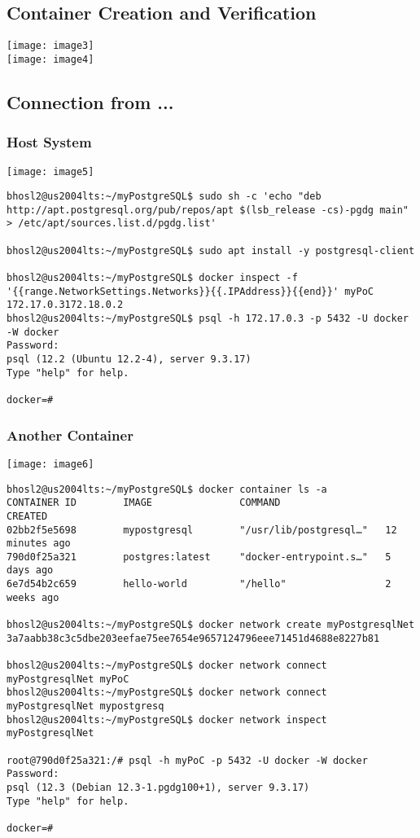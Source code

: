 \documentclass[]{article}
\begin{document}
\subsection{Container Creation and Verification}
	\texttt{[image: image3]} \vspace{1em} \\
	\texttt{[image: image4]}
	\pagebreak
\subsection{Connection from ...}
\subsubsection{Host System}
	\texttt{[image: image5]}
	\begin{verbatim}
bhosl2@us2004lts:~/myPostgreSQL$ sudo sh -c 'echo "deb http://apt.postgresql.org/pub/repos/apt $(lsb_release -cs)-pgdg main" > /etc/apt/sources.list.d/pgdg.list'	

bhosl2@us2004lts:~/myPostgreSQL$ sudo apt install -y postgresql-client

bhosl2@us2004lts:~/myPostgreSQL$ docker inspect -f '{{range.NetworkSettings.Networks}}{{.IPAddress}}{{end}}' myPoC 172.17.0.3172.18.0.2
bhosl2@us2004lts:~/myPostgreSQL$ psql -h 172.17.0.3 -p 5432 -U docker -W docker
Password:
psql (12.2 (Ubuntu 12.2-4), server 9.3.17)
Type "help" for help.

docker=# 
	\end{verbatim}
	\pagebreak
\subsubsection{Another Container}	
	\texttt{[image: image6]}
	\begin{verbatim}
bhosl2@us2004lts:~/myPostgreSQL$ docker container ls -a
CONTAINER ID        IMAGE               COMMAND                  CREATED
02bb2f5e5698        mypostgresql        "/usr/lib/postgresql…"   12 minutes ago
790d0f25a321        postgres:latest     "docker-entrypoint.s…"   5 days ago
6e7d54b2c659        hello-world         "/hello"                 2 weeks ago

bhosl2@us2004lts:~/myPostgreSQL$ docker network create myPostgresqlNet
3a7aabb38c3c5dbe203eefae75ee7654e9657124796eee71451d4688e8227b81

bhosl2@us2004lts:~/myPostgreSQL$ docker network connect myPostgresqlNet myPoC
bhosl2@us2004lts:~/myPostgreSQL$ docker network connect myPostgresqlNet mypostgresq
bhosl2@us2004lts:~/myPostgreSQL$ docker network inspect myPostgresqlNet

root@790d0f25a321:/# psql -h myPoC -p 5432 -U docker -W docker
Password:
psql (12.3 (Debian 12.3-1.pgdg100+1), server 9.3.17)
Type "help" for help.

docker=# 
	\end{verbatim}
\end{document}
